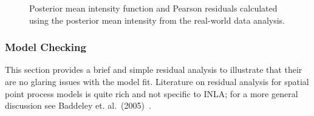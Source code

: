 \documentclass[]{interact}
\begin{document}
\begin{figure}[p]



\caption{Posterior mean intensity function and Pearson residuals calculated
using the posterior mean intensity from the real-world data analysis.}
\label{beiintensity}
\end{figure}


\subsubsection{Model Checking}
\label{beiresid}

This section provides a brief and simple residual analysis to illustrate that
their are no glaring issues with the model fit. Literature on residual analysis
for spatial point process models is quite rich and not specific to INLA; for a
more general discussion see Baddeley et. al.~(2005)~\cite{baddeleyresiduals}.
\end{document}
